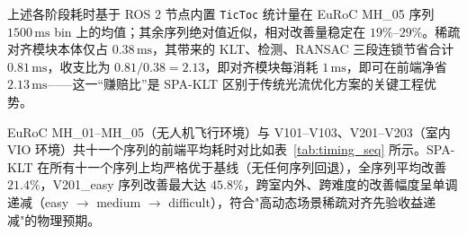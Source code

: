 \documentclass[letterpaper,journal]{IEEEtran}
\begin{document}
上述各阶段耗时基于 ROS 2 节点内置 \texttt{TicToc} 统计量在 EuRoC MH\_05 序列 $1500\,\mathrm{ms}$ bin 上的均值；其余序列绝对值近似，相对改善量稳定在 $19\%$--$29\%$。稀疏对齐模块本体仅占 $0.38\,\mathrm{ms}$，其带来的 KLT、检测、RANSAC 三段连锁节省合计 $0.81\,\mathrm{ms}$，收支比为 $0.81/0.38 = 2.13$，即对齐模块每消耗 $1\,\mathrm{ms}$，即可在前端净省 $2.13\,\mathrm{ms}$——这一``赚赔比''是 SPA-KLT 区别于传统光流优化方案的关键工程优势。

EuRoC MH\_01--MH\_05（无人机飞行环境）与 V101--V103、V201--V203（室内 VIO 环境）共十一个序列的前端平均耗时对比如表~\ref{tab:timing_seq} 所示。SPA-KLT 在所有十一个序列上均严格优于基线（无任何序列回退），全序列平均改善 $21.4\%$，V201\_easy 序列改善最大达 $45.8\%$，跨室内外、跨难度的改善幅度呈单调递减（easy $\rightarrow$ medium $\rightarrow$ difficult），符合"高动态场景稀疏对齐先验收益递减"的物理预期。

\begin{table}[!t]
\centering
\caption{EuRoC MH\_01--MH\_05 与 V101--V103、V201--V203 前端平均耗时对比（V1/V2 为前 500 帧 10 bin 均值,MH 为 $1500\,\mathrm{ms}$ 起始 3 bin 均值,单位：$\mathrm{ms}$/帧）。}
\label{tab:timing_seq}
\end{table}
\end{document}
